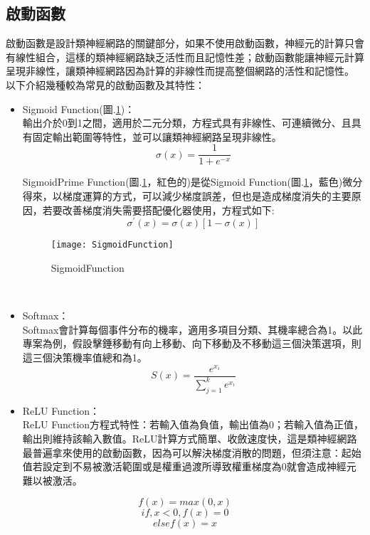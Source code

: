 \subsection{啟動函數}
啟動函數是設計類神經網路的關鍵部分，如果不使用啟動函數，神經元的計算只會有線性組合，這樣的類神經網路缺乏活性而且記憶性差；啟動函數能讓神經元計算呈現非線性，讓類神經網路因為計算的非線性而提高整個網路的活性和記憶性。\\
以下介紹幾種較為常見的啟動函數及其特性：
\begin{itemize}
\item Sigmoid Function(圖.\ref{SigmoidFunction})：\\
輸出介於0到1之間，適用於二元分類，方程式具有非線性、可連續微分、且具有固定輸出範圍等特性，並可以讓類神經網路呈現非線性。
$$\sigma(x)=\frac{1}{1+e^{-x}}$$

SigmoidPrime Function(圖.\ref{SigmoidFunction}，紅色的)是從Sigmoid Function(圖.\ref{SigmoidFunction}，藍色)微分得來，以梯度運算的方式，可以減少梯度誤差，但也是造成梯度消失的主要原因，若要改善梯度消失需要搭配優化器使用，方程式如下:\\
$$\sigma^{'}(x)=\sigma(x)[1-\sigma(x)]$$
\begin{figure}[hbt!]
\begin{center}
\texttt{[image: SigmoidFunction]}
\caption{\Large SigmoidFunction}\label{SigmoidFunction}
\end{center}
\end{figure}
\\
\item Softmax：\\
Softmax會計算每個事件分布的機率，適用多項目分類、其機率總合為1。以此專案為例，假設擊錘移動有向上移動、向下移動及不移動這三個決策選項，則這三個決策機率值總和為1。\\
$$S(x)=\frac{e^{x_i}}{\sum^k_{j=1}e^{x_i}}$$
\item ReLU Function：\\
ReLU Function方程式特性：若輸入值為負值，輸出值為0；若輸入值為正值，輸出則維持該輸入數值。ReLU計算方式簡單、收斂速度快，這是類神經網路最普遍拿來使用的啟動函數，因為可以解決梯度消散的問題，但須注意：起始值若設定到不易被激活範圍或是權重過渡所導致權重梯度為0就會造成神經元難以被激活。\\
\end{itemize}
$$f(x)=max(0,x)$$
$$if , x<0 , f(x)=0$$
$$else f(x)=x$$
